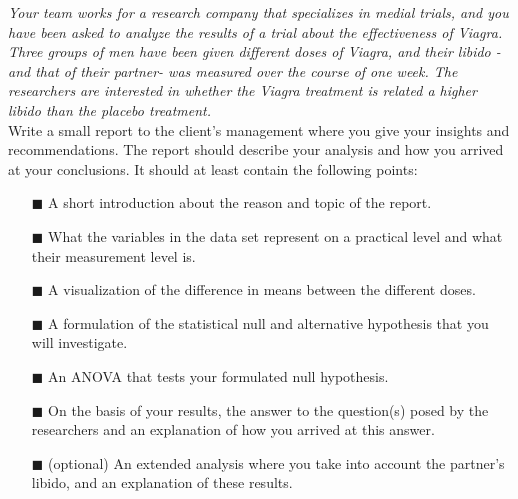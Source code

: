 \textit{Your team works for a research company that specializes in medial trials, and you have been asked to analyze the results of a trial about the effectiveness of Viagra. Three groups of men have been given different doses of Viagra, and their libido -and that of their partner- was measured over the course of one week. The researchers are interested in whether the Viagra treatment is related a higher libido than the placebo treatment.} \\

Write a small report to the client's management where you give your insights and recommendations. The report should describe your analysis and how you arrived at your conclusions. It should at least contain the following points: \\

\begin{itemize}
    \item[$\blacksquare$] A short introduction about the reason and topic of the report.
    \item[$\blacksquare$] What the variables in the data set represent on a practical level and what their measurement level is. 
    \item[$\blacksquare$] A visualization of the difference in means between the different doses.
    \item[$\blacksquare$] A formulation of the statistical null and alternative hypothesis that you will investigate.
    \item[$\blacksquare$] An ANOVA that tests your formulated null hypothesis.
    \item[$\blacksquare$] On the basis of your results, the answer to the question(s) posed by the researchers and an explanation of how you arrived at this answer.
    \item[$\blacksquare$] (optional) An extended analysis where you take into account the partner's libido, and an explanation of these results.
\end{itemize}

\clearpage %